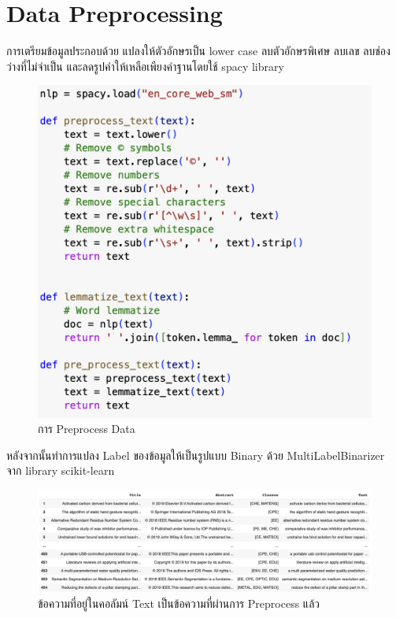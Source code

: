 \section{Data Preprocessing}
การเตรียมข้อมูลประกอบด้วย แปลงให้ตัวอักษรเป็น lower case ลบตัวอักษรพิเศษ ลบเลข ลบช่องว่างที่ไม่จำเป็น และลดรูปคำให้เหลือเพียงคำฐานโดยใช้ spacy library \cite{spacy2}
\begin{figure}[ht]
    \centering
    \includegraphics[width=\imgwidth]
    {images/preprocess.jpg}
    \caption{การ Preprocess Data}
    \label{fig:preprocess}
\end{figure}


หลังจากนั้นทำการแปลง Label ของข้อมูลให้เป็นรูปแบบ Binary ด้วย MultiLabelBinarizer จาก library scikit-learn \cite{pedregosa2011scikit}

\begin{figure}[ht]
    \centering
    \includegraphics[width=\imgwidth]
    {images/dataframe_after_preprocessed.jpg}
    \caption{ข้อความที่อยู่ในคอลัมน์ Text เป็นข้อความที่ผ่านการ Preprocess แล้ว}
    \label{fig:dataframe_after_preprocessed}
\end{figure}